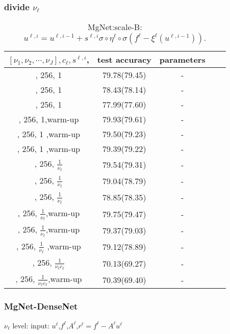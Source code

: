 \subsubsection{divide $\nu_{\ell}$}
\begin{table}[!htbp]
	\caption{MgNet:scale-B: $u^{\ell,i} = u^{\ell,i-1} + s^{\ell,i} \sigma \circ \eta^{\ell} \circ \sigma   ({f^\ell -  \xi^{\ell} (u^{\ell,i-1})}).$}
	\label{tabel:mgnet-scale}	
	\begin{center}
		\begin{tabular}{|c|c|c|c|c|}
			\hline
			$[\nu_1,\nu_2,\cdots,\nu_J], c_\ell, s^{\ell,i}$,  &  test accuracy
			& parameters  \tabularnewline
			\hline
			[2,2,2,2], 256, 1   &  79.78(79.45)   & -
			\tabularnewline
			\hline	
			[2,2,2,16], 256, 1   &  78.43(78.14)    & -
			\tabularnewline
			\hline		
			[2,2,2,32], 256, 1   & 77.99(77.60)    & -
			\tabularnewline
			\hline	
			[2,2,2,2], 256, 1,warm-up   &  79.93(79.61)   & -
			\tabularnewline
			\hline	
			[2,2,2,16], 256, 1 ,warm-up  & 79.50(79.23)   & -
			\tabularnewline
			\hline		
			[2,2,2,32], 256, 1 ,warm-up  &  79.39(79.22)     & -
			\tabularnewline
			\hline		
			[2,2,2,2], 256, $\frac{1}{\nu_\ell}$   &  79.54(79.31)    & -
			\tabularnewline
			\hline		
			[2,2,2,16], 256, $\frac{1}{\nu_\ell}$   & 79.04(78.79)     & -
			\tabularnewline
			\hline		
			[2,2,2,32], 256, $\frac{1}{\nu_\ell}$   &  78.85(78.35)   & -
			\tabularnewline
			\hline
			[2,2,2,2], 256, $\frac{1}{\nu_\ell}$,warm-up   &  79.75(79.47)     & -
			\tabularnewline
			\hline		
			[2,2,2,16], 256, $\frac{1}{\nu_\ell}$,warm-up   & 79.37(79.03)   & -
			\tabularnewline
			\hline		
			[2,2,2,32], 256, $\frac{1}{\nu_\ell}$ ,warm-up  &  79.12(78.89) & -
			\tabularnewline
			\hline
			[2,2,2,16], 256, $\frac{1}{\nu_\ell c_\ell}$   &  70.13(69.27)    & -
			\tabularnewline
			\hline		
			[2,2,2,16], 256, $\frac{1}{\nu_\ell c_\ell}$,warm-up   &  70.39(69.40)    & -
			\tabularnewline
			\hline
		\end{tabular}
	\end{center}
\end{table}

\subsubsection{MgNet-DenseNet}
$\nu_\ell$ level: input: $u^{\ell}$,$f^{\ell}$,$A^{\ell}$,$r^{\ell}=f^{\ell}-A^{\ell}u^{\ell}$

